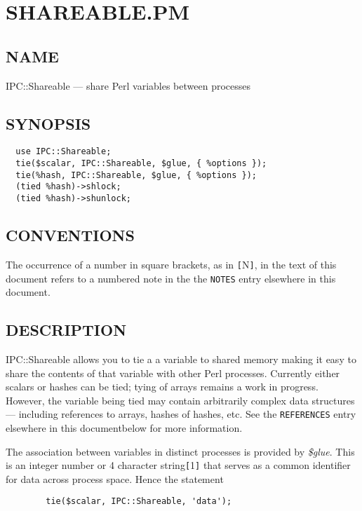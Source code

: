 
\section{SHAREABLE.PM}%

\subsection*{NAME}
IPC::Shareable --- share Perl variables between processes

\subsection*{SYNOPSIS}\begin{verbatim}
  use IPC::Shareable;
  tie($scalar, IPC::Shareable, $glue, { %options });
  tie(%hash, IPC::Shareable, $glue, { %options });
  (tied %hash)->shlock;
  (tied %hash)->shunlock;
\end{verbatim}

\subsection*{CONVENTIONS}%

The occurrence of a number in square brackets, as in {\tt [}N{\tt ]}, in the text
of this document refers to a numbered note in the the {\tt NOTES} entry elsewhere in this document.

\subsection*{DESCRIPTION}
IPC::Shareable allows you to tie a a variable to shared memory making
it easy to share the contents of that variable with other Perl
processes.  Currently either scalars or hashes can be tied; tying of
arrays remains a work in progress.  However, the variable being tied
may contain arbitrarily complex data structures --- including references
to arrays, hashes of hashes, etc.  See the {\tt REFERENCES} entry elsewhere in this documentbelow for
more information.

The association between variables in distinct processes is provided by
{\em \$glue\/}.  This is an integer number or 4 character string{\tt [}1{\tt ]} that serves
as a common identifier for data across process space.  Hence the
statement
\begin{verbatim}
        tie($scalar, IPC::Shareable, 'data');
\end{verbatim}

